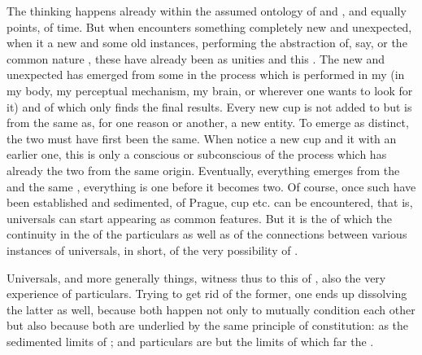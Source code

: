 The  thinking happens already within the assumed ontology of
 and , and equally 
points,  of time.  But when  encounters
something completely new 
and unexpected, when it  a new and some old instances, performing the
abstraction of, say,  or the common nature , these have
already been  as unities  and  this
. The  new and unexpected has emerged from
some  in the process which is performed in my  (in my
body, my perceptual mechanism, my brain, or wherever one wants to look for it)
and of which  only finds the final results.  Every new cup is not
added to but is  from the same  as, for one reason
or another, a new entity. To emerge as distinct, the two must have first been
the same. When  notice a new cup and  it with an earlier
one, this is only a conscious or subconscious  of the process
which has already  the two from the same origin.  Eventually,
everything emerges from the  and the same , everything is
one before it becomes two.  Of course, once such  have been
established and sedimented,  of Prague, cup etc. can be
encountered, that 
is, universals can start appearing as common features.  But it is the 
of  which  the continuity in the  of
the particulars as well as of the connections between various instances of
universals, in short, of the very possibility of 
. 

Universals, and more generally  things, witness thus to this
 of ,  also the very experience of
particulars. Trying to get rid of the former, one ends up dissolving the latter
as well, because both happen not only to mutually condition each other but also
because both are underlied by the same principle of constitution: as the
sedimented limits of ; and particulars are but the 
limits of  which  far  the \hoa. 




